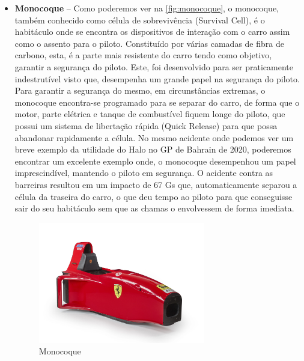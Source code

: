 \documentclass{report}
\begin{document}
\begin{itemize}
\item \textbf{Monocoque} – Como poderemos ver na \autoref{fig:monocoque}, o monocoque, também conhecido como célula de sobrevivência (Survival Cell), é o habitáculo onde se encontra os dispositivos de interação com o carro assim como o assento para o piloto. Constituído por várias camadas de fibra de carbono, esta, é a parte mais resistente do carro tendo como objetivo, garantir a segurança do piloto. Este, foi desenvolvido para ser praticamente indestrutível visto que, desempenha um grande papel na segurança do piloto.
Para garantir a segurança do mesmo, em circunstâncias extremas, o monocoque encontra-se programado para se separar do carro, de forma que o motor, parte elétrica e tanque de combustível fiquem longe do piloto, que possui um sistema de libertação rápida (Quick Release) para que possa abandonar rapidamente a célula.
No mesmo acidente onde podemos ver um breve exemplo da utilidade do Halo no GP de Bahrain de 2020, poderemos encontrar um excelente exemplo onde, o monocoque desempenhou um papel imprescindível, mantendo o piloto em segurança. 
O acidente contra as barreiras resultou em um impacto de 67 Gs que, automaticamente separou a célula da traseira do carro, o que deu tempo ao piloto para que conseguisse sair do seu habitáculo sem que as chamas o envolvessem de forma imediata.\\[4cm]
\begin{figure}[h]
\center %
\includegraphics[height=150pt]{monocoque}
\caption{Monocoque}
\label{fig:monocoque}
\end{figure}



\end{itemize}
\end{document}
